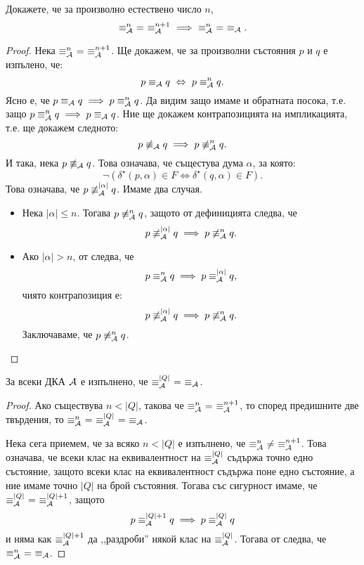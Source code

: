 \begin{proposition}\label{pr:minimisation-cubic:equiv-approx}
  Докажете, че за произволно естествено число $n$,
  \[\equiv^n_\A\ =\ \equiv^{n+1}_\A\ \implies\ \equiv^n_\A\ =\ \equiv_\A.\]
\end{proposition}
\begin{proof}
  Нека $\equiv^n_\A\ =\ \equiv^{n+1}_\A$.
  Ще докажем, че за произволни състояния $p$ и $q$ е изпълено, че:
  \[p \equiv_{\mathcal{A}} q \ \Leftrightarrow\  p \equiv^n_{\mathcal{A}} q.\]
  Ясно е, че $p \equiv_{\mathcal{A}} q \implies p \equiv^n_{\mathcal{A}} q$. 
  Да видим защо имаме и обратната посока, т.е. защо $p \equiv^n_{\mathcal{A}} q \implies p \equiv_{\mathcal{A}} q$.
  Ние ще докажем контрапозицията на импликацията, т.е. ще докажем следното:
  \[p \not\equiv_{\mathcal{A}} q \implies p \not\equiv^n_{\mathcal{A}} q.\]
  И така, нека $p \not\equiv_{\mathcal{A}} q$. Това означава, че същестува дума $\alpha$, за която:
  \[\neg(\delta^\star(p,\alpha) \in F \iff \delta^\star(q,\alpha) \in F).\]
  Това означава, че $p \not\equiv^{|\alpha|}_{\mathcal{A}} q$. Имаме два случая.
  \begin{itemize}
  \item
    Нека $|\alpha| \leq n$.
    Тогава $p \not\equiv^n_{\mathcal{A}} q$, защото от дефиницията следва, че
    \[p \not\equiv^{|\alpha|}_{\mathcal{A}} q \implies p \not\equiv^n_{\mathcal{A}} q.\]
  \item
    Ако $|\alpha| > n$, от  следва, че
    \[p \equiv^n_{\mathcal{A}} q \implies p \equiv^{|\alpha|}_{\mathcal{A}} q,\]
    чиято контрапозиция е:
    \[p \not\equiv^{|\alpha|}_{\mathcal{A}} q \implies p \not\equiv^{n}_{\mathcal{A}} q.\]
    Заключаваме, че $p \not\equiv^{n}_{\mathcal{A}} q$.
  \end{itemize}
\end{proof}

\begin{proposition}
  За всеки ДКА $\mathcal{A}$ е изпълнено, че 
  $\equiv^{|Q|}_{\mathcal{A}}\ =\ \equiv_{\mathcal{A}}$.
\end{proposition}
\begin{proof}
  Ако съществува $n < |Q|$, такова че $\equiv^n_\A\ =\ \equiv^{n+1}_\A$, то според предишните две твърдения,
  то $\equiv^n_\A\ =\ \equiv^{|Q|}_\A\ =\ \equiv_\A$.

  Нека сега приемем, че за всяко $n < |Q|$ е изпълнено, че $\equiv^n_\A\ \neq\ \equiv^{n+1}_\A$.
  Това означава, че всеки клас на еквивалентност на $\equiv^{|Q|}_{\mathcal{A}}$ съдържа точно едно състояние, защото
  всеки клас на еквивалентност съдържа поне едно състояние, а ние имаме точно $|Q|$ на брой състояния.
  Тогава със сигурност имаме, че $\equiv^{|Q|}_{\mathcal{A}}\ =\ \equiv^{|Q|+1}_{\mathcal{A}}$,
  защото
  \[p \equiv^{|Q|+1}_{\mathcal{A}} q \implies p \equiv^{|Q|}_{\mathcal{A}} q\]
  и няма как $\equiv^{|Q|+1}_{\mathcal{A}}$ да ,,раздроби'' някой клас на $\equiv^{|Q|}_{\mathcal{A}}$.
  Тогава от  следва, че $\equiv^n_{\mathcal{A}}\ =\ \equiv_{\mathcal{A}}$.
\end{proof}

